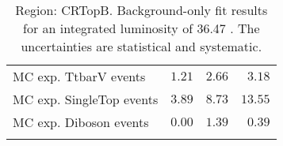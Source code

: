 \begin{table}
\begin{center}
{\begin{tabular*}{\textwidth}{@{\extracolsep{\fill}}lrrr}
        MC exp. TtbarV events         & $1.21$          & $2.66$          & $3.18$              \\
        MC exp. SingleTop events         & $3.89$          & $8.73$          & $13.55$              \\
        MC exp. Diboson events         & $0.00$          & $1.39$          & $0.39$              \\
\noalign{\smallskip}\hline\noalign{\smallskip}
\end{tabular*}
}
\end{center}
\caption{Region: CRTopB. Background-only fit results for an integrated luminosity of 36.47 \ifb. The uncertainties are statistical and systematic.
}
\label{table.bkgonly.CRTopB}
\end{table}
%